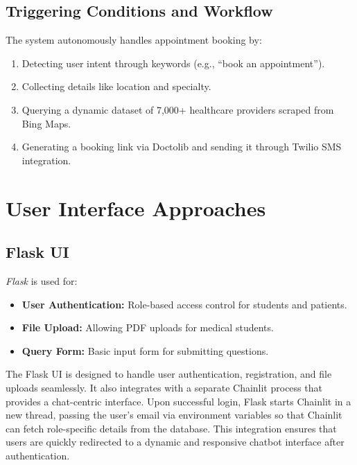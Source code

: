 \subsection{Triggering Conditions and Workflow}
\label{subsec:booking_workflow}
The system autonomously handles appointment booking by:
\begin{enumerate}
    \item Detecting user intent through keywords (e.g., “book an appointment”).
    \item Collecting details like location and specialty.
    \item Querying a dynamic dataset of 7,000+ healthcare providers scraped from Bing Maps.
    \item Generating a booking link via Doctolib and sending it through Twilio SMS integration.
\end{enumerate}

\section{User Interface Approaches}
\label{sec:user_interface}

\subsection{Flask UI}
\label{subsec:flask_ui}
\emph{Flask} is used for:
\begin{itemize}
    \item \textbf{User Authentication:} Role-based access control for students and patients.
    \item \textbf{File Upload:} Allowing PDF uploads for medical students.
    \item \textbf{Query Form:} Basic input form for submitting questions.
\end{itemize}

The Flask UI is designed to handle user authentication, registration, and file uploads seamlessly. It also integrates with a separate Chainlit process that provides a chat-centric interface. Upon successful login, Flask starts Chainlit in a new thread, passing the user's email via environment variables so that Chainlit can fetch role-specific details from the database. This integration ensures that users are quickly redirected to a dynamic and responsive chatbot interface after authentication.

